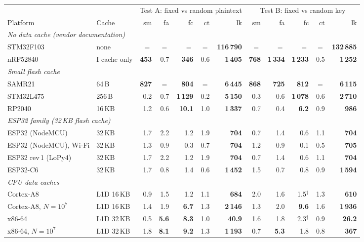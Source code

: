 \begin{tabular}{llrrrrr|rrrrr}
\hline
 & & \multicolumn{5}{c|}{Test A: fixed vs random plaintext} & \multicolumn{5}{c}{Test B: fixed vs random key}\\
Platform & Cache & sm & fa & fc & ct & lk & sm & fa & fc & ct & lk\\
\hline
\multicolumn{12}{l}{\emph{No data cache (vendor documentation)}}\\
STM32F103 & none & $=$ & $=$ & $=$ & $=$ & \textbf{116\,790} & $=$ & $=$ & $=$ & $=$ & \textbf{132\,885}\\
nRF52840 & I-cache only & \textbf{453} & 0.7 & \textbf{346} & 0.6 & \textbf{1\,405} & \textbf{768} & \textbf{1\,334} & \textbf{1\,233} & 0.5 & \textbf{1\,252}\\
\multicolumn{12}{l}{\emph{Small flash cache}}\\
SAMR21 & 64\,B & \textbf{827} & $=$ & \textbf{804} & $=$ & \textbf{6\,445} & \textbf{868} & \textbf{725} & \textbf{812} & $=$ & \textbf{6\,115}\\
STM32L475 & 256\,B & 0.2 & 0.7 & \textbf{1\,129} & 0.2 & \textbf{5\,150} & 0.3 & 0.6 & \textbf{1\,078} & 0.6 & \textbf{2\,710}\\
RP2040 & 16\,KB & 1.2 & 0.6 & \textbf{10.1} & 1.0 & \textbf{1\,337} & 0.7 & 0.4 & \textbf{6.2} & 0.9 & \textbf{986}\\
\multicolumn{12}{l}{\emph{ESP32 family (32\,KB flash cache)}}\\
ESP32 (NodeMCU) & 32\,KB & 1.7 & 2.2 & 1.2 & 1.9 & \textbf{704} & 0.7 & 1.4 & 0.6 & 1.1 & \textbf{704}\\
ESP32 (NodeMCU), Wi-Fi & 32\,KB & 1.3 & 0.9 & 0.3 & 0.7 & \textbf{704} & 1.2 & 0.9 & 0.1 & 0.5 & \textbf{705}\\
ESP32 rev\,1 (LoPy4) & 32\,KB & 1.7 & 2.2 & 1.2 & 1.9 & \textbf{704} & 0.7 & 1.4 & 0.6 & 1.1 & \textbf{704}\\
ESP32-C6 & 32\,KB & 1.7 & 0.8 & 1.4 & 0.6 & \textbf{1\,452} & 1.5 & 0.7 & 0.8 & 0.9 & \textbf{1\,594}\\
\multicolumn{12}{l}{\emph{CPU data caches}}\\
Cortex-A8 & L1D 16\,KB & 0.9 & 1.5 & 1.2 & 1.1 & \textbf{684} & 2.0 & 1.6 & 1.5$^{\dagger}$ & 1.3 & \textbf{610}\\
Cortex-A8, $N=10^7$ & L1D 16\,KB & 1.4 & 1.9 & \textbf{6.7} & 1.3 & \textbf{2\,146} & 1.3 & 2.0 & \textbf{9.6} & 1.6 & \textbf{1\,936}\\
x86-64 & L1D 32\,KB & 0.5 & \textbf{5.6} & \textbf{8.3} & 1.0 & \textbf{40.9} & 1.6 & 1.8 & 2.3$^{\dagger}$ & 0.9 & \textbf{26.2}\\
x86-64, $N=10^7$ & L1D 32\,KB & 1.8 & \textbf{8.1} & \textbf{9.2} & 1.3 & \textbf{1\,193} & 0.7 & \textbf{5.3} & 1.8 & 0.8 & \textbf{367}\\
\hline
\end{tabular}
